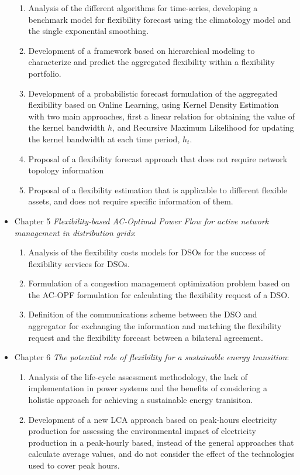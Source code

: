 \begin{itemize}
\begin{enumerate}
		\item Analysis of the different algorithms for time-series, developing a benchmark model for flexibility forecast using the climatology model and the single exponential smoothing. 
		\item Development of a framework based on hierarchical modeling to characterize and predict the aggregated flexibility within a flexibility portfolio.
		\item Development  of a probabilistic forecast formulation of the aggregated flexibility based on Online Learning, using Kernel Density Estimation with two main approaches, first a linear relation for obtaining the value of the kernel bandwidth $h$, and Recursive Maximum Likelihood for updating the kernel bandwidth at each time period, $h_t$.
		\item Proposal of a flexibility forecast approach that does not require network topology information
		\item Proposal of a flexibility estimation that is applicable to different flexible assets, and does not require specific information of them. 
	\end{enumerate}
\item Chapter 5 \textit{Flexibility-based AC-Optimal Power Flow for active network management in distribution grids}: 
	\begin{enumerate}
		\item Analysis of the flexibility costs models for DSOs for the success of flexibility services for DSOs. 
		\item Formulation of a congestion management optimization problem based on the AC-OPF formulation for calculating the flexibility request of a DSO.
		\item Definition of the communications scheme between the DSO and aggregator for exchanging the information and matching the flexibility request and the flexibility forecast between a bilateral agreement.
	\end{enumerate}
\item Chapter 6 \textit{The potential role of flexibility for a sustainable energy transition}: 
	\begin{enumerate}
		\item Analysis of the life-cycle assessment methodology, the lack of implementation in power systems and the benefits of considering a holistic approach for achieving a sustainable energy tranisiton. 
		\item Development of a new LCA approach based on peak-hours electricity production for assessing the environmental impact of electricity production in a peak-hourly based, instead of the general approaches that calculate average values, and do not consider the effect of the technologies used to cover peak hours. 

\end{enumerate}
\end{itemize}
